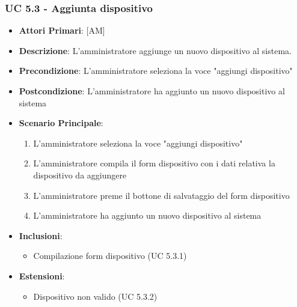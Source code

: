 			\subsubsection{UC 5.3 - Aggiunta dispositivo}
			\begin{itemize}
				\item \textbf{Attori Primari}: [AM]
				\item \textbf{Descrizione}: L'amministratore aggiunge un nuovo dispositivo al sistema.
				\item \textbf{Precondizione}: L'amministratore seleziona la voce "aggiungi dispositivo"
				\item \textbf{Postcondizione}: L'amministratore ha aggiunto un nuovo dispositivo al sistema
				\item \textbf{Scenario Principale}:
				\begin{enumerate}
					\item{L'amministratore seleziona la voce "aggiungi dispositivo"}
					\item{L'amministratore compila il form dispositivo con i dati relativa la dispositivo da aggiungere}
					\item{L'amministratore preme il bottone di salvataggio del form dispositivo}
					\item{L'amministratore ha aggiunto un nuovo dispositivo al sistema}
				\end{enumerate}
				\item \textbf{Inclusioni}:
				\begin{itemize}
					\item Compilazione form dispositivo (UC 5.3.1)
				\end{itemize}
				\item \textbf{Estensioni}:
				\begin{itemize}
					\item Dispositivo non valido (UC 5.3.2)
				\end{itemize}
			\end{itemize}
			
